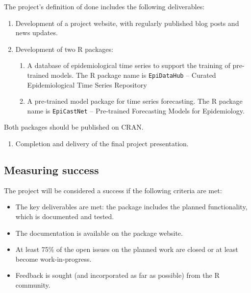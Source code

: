 \documentclass[
]{article}
\providecommand{\tightlist}{%
  \setlength{\itemsep}{0pt}\setlength{\parskip}{0pt}}
\begin{document}
The project's definition of done includes the following deliverables:

\begin{enumerate}
\def\labelenumi{\arabic{enumi}.}
\item
  Development of a project website, with regularly published blog posts
  and news updates.
\item
  Development of two R packages:

  \begin{enumerate}
  \def\labelenumii{\roman{enumii}.}
  \item
    A database of epidemiological time series to support the training of
    pre-trained models. The R package name is \texttt{EpiDataHub} --
    Curated Epidemiological Time Series Repository
  \item
    A pre-trained model package for time series forecasting. The R
    package name is \texttt{EpiCastNet} -- Pre-trained Forecasting
    Models for Epidemiology.
  \end{enumerate}
\end{enumerate}

Both packages should be published on CRAN.

\begin{enumerate}
\def\labelenumi{\arabic{enumi}.}
\setcounter{enumi}{2}
\tightlist
\item
  Completion and delivery of the final project presentation.
\end{enumerate}

\subsection{Measuring success}\label{measuring-success}

The project will be considered a success if the following criteria are
met:

\begin{itemize}
\tightlist
\item
  The key deliverables are met: the package includes the planned
  functionality, which is documented and tested.
\item
  The documentation is available on the package website.
\item
  At least 75\% of the open issues on the planned work are closed or at
  least become work-in-progress.
\item
  Feedback is sought (and incorporated as far as possible) from the R
  community.
\end{itemize}
\end{document}
